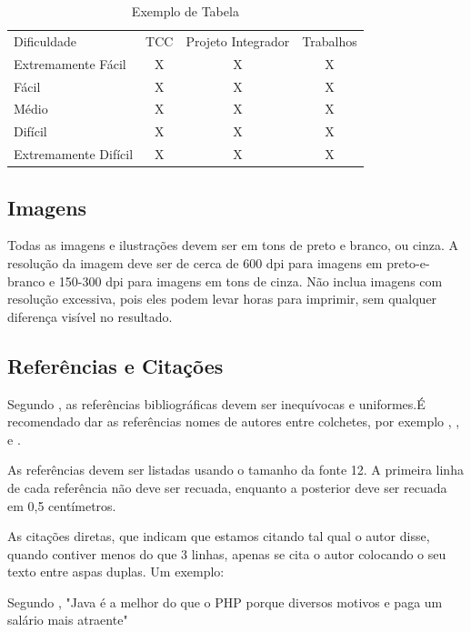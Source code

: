\documentclass[12pt]{article}
\begin{document}
\begin{table}[!ht]
\centering
\caption{Exemplo de Tabela}
\begin{tabular}{l|c|c|c}

\hline\noalign{\smallskip}

Dificuldade			& TCC & Projeto Integrador & Trabalhos\\
\noalign{\smallskip}
\hline
\noalign{\smallskip}
Extremamente Fácil	 & X & X & X\\
Fácil	             & X & X & X\\
Médio			     & X & X & X\\
Difícil				 & X & X & X\\
Extremamente Difícil & X & X & X\\
\hline
\end{tabular}
\label{Exemplo de Tabela}
\end{table}

\subsection{Imagens}

Todas as imagens e ilustrações devem ser em tons de preto e branco, ou cinza. A resolução da imagem deve ser de cerca de 600 dpi para
imagens em preto-e-branco e 150-300 dpi para imagens em tons de cinza. Não inclua imagens com resolução excessiva, pois eles podem levar horas para imprimir, sem qualquer diferença visível no resultado.


\subsection{Referências e Citações}

Segundo \cite{WinNT}, as referências bibliográficas devem ser inequívocas e uniformes.É recomendado dar as referências nomes de autores entre colchetes, por exemplo \cite{knuth:84}, \cite{boulic:91}, e \cite{smith:99}.

As referências devem ser listadas usando o tamanho da fonte 12. A primeira linha de cada referência não deve ser recuada, enquanto a posterior deve ser recuada em 0,5 centímetros.

As citações diretas, que indicam que estamos citando tal qual o autor disse, quando contiver menos do que 3 linhas, apenas se cita o autor colocando o seu texto entre aspas duplas. Um exemplo:

Segundo \cite{knuth:84}, "Java é a melhor do que o PHP porque diversos motivos e paga um salário mais atraente"
\end{document}
